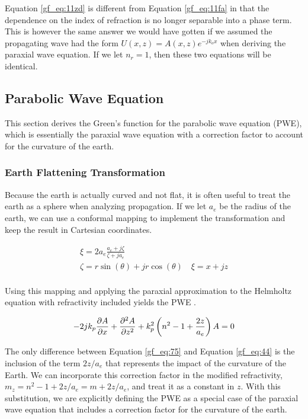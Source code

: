 Equation \ref{gf_eq:11zd} is different from Equation  \ref{gf_eq:11fa} in that the dependence on the index of refraction is no longer separable into a phase term. This is however the same answer we would have gotten if we assumed the propagating wave had the form $U(x,z) = A(x,z)e^{-jk_ox}$ when deriving the paraxial wave equation. If we let $n_r = 1$, then these two equations will be identical.

\subsection{Parabolic Wave Equation}
This section derives the Green's function for the parabolic wave equation (PWE), which is essentially the paraxial wave equation with a correction factor to account for the curvature of the earth.

\subsubsection{Earth Flattening Transformation}
Because the earth is actually curved and not flat, it is often useful to treat the earth as a sphere when analyzing propagation. If we let $a_e$ be the radius of the earth, we can use a conformal mapping to implement the transformation \cite{kuttler_pe_theory} and keep the result in Cartesian coordinates.

\begin{equation}
\begin{gathered} 
\xi = 2a_e\frac{a_e+j\zeta}{\zeta + ja_e} \\
\zeta = r\sin(\theta) + jr\cos(\theta)  \quad \xi=x+jz\\
\label{gf_eq:74}
\end{gathered}
\end{equation}
\renewcommand{\baselinestretch}{2} \small\normalsize

Using this mapping and applying the paraxial approximation to the Helmholtz equation with refractivity included yields the PWE \cite{kuttler_pe_theory} \cite{dockery_pe}.
 
\begin{equation}
-2jk_p\frac{\partial A}{\partial x} + \frac{\partial^2 A}{\partial z^2} +k_p^2\left(n^2-1+\frac{2z}{a_e} \right)A = 0 \\
\label{gf_eq:75}
\end{equation}
\renewcommand{\baselinestretch}{2} \small\normalsize

The only difference between Equation \ref{gf_eq:75} and Equation \ref{gf_eq:44} is the inclusion of the term $2z/a_e$ that represents the impact of the curvature of the Earth. We can incorporate this correction factor in the modified refractivity, $m_z = n^2-1 + 2z/a_e = m + 2z/a_e$, and treat it as a constant in $z$. With this substitution, we are explicitly defining the PWE as a special case of the paraxial wave equation that includes a correction factor for the curvature of the earth.

